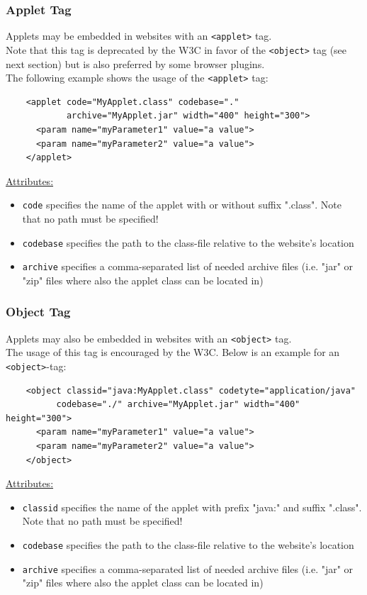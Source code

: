  \subsubsection{Applet Tag}
  Applets may be embedded in websites with an \verb|<applet>| tag.\\
  Note that this tag is deprecated by the W3C in favor of the \verb|<object>| tag (see next section)
  but is also preferred by some browser plugins.\\
  The following example shows the usage of the \verb|<applet>| tag:
  \begin{verbatim}
    <applet code="MyApplet.class" codebase="." 
            archive="MyApplet.jar" width="400" height="300">
      <param name="myParameter1" value="a value">
      <param name="myParameter2" value="a value">
    </applet>
  \end{verbatim}
  \underline{Attributes:}
  \begin{itemize}
  \item \verb|code| specifies the name of the applet with or without suffix ".class". Note that no path must be specified!
  \item \verb|codebase| specifies the path to the class-file relative to the website's location
  \item \verb|archive| specifies a comma-separated list of needed archive files (i.e. "jar" or "zip" 
        files where also the applet class can be located in)
  \end{itemize}
  
  \subsubsection{Object Tag}
  Applets may also be embedded in websites with an \verb|<object>| tag.\\
  The usage of this tag is encouraged by the W3C.
  Below is an example for an \verb|<object>|-tag:
  \begin{verbatim}
    <object classid="java:MyApplet.class" codetyte="application/java"
          codebase="./" archive="MyApplet.jar" width="400" height="300">
      <param name="myParameter1" value="a value">
      <param name="myParameter2" value="a value">
    </object>
  \end{verbatim}
  \underline{Attributes:}
  \begin{itemize}
  \item \verb|classid| specifies the name of the applet with prefix "java:" and suffix ".class". Note that no path must be specified!
  \item \verb|codebase| specifies the path to the class-file relative to the website's location
  \item \verb|archive| specifies a comma-separated list of needed archive files (i.e. "jar" or "zip" 
        files where also the applet class can be located in)
  \end{itemize}

